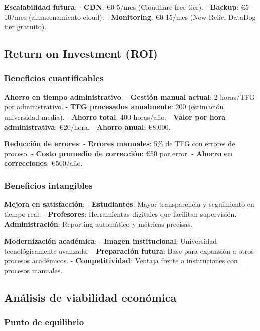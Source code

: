 \documentclass[12pt,a4paper,oneside]{report}
\begin{document}
\textbf{Escalabilidad futura}: - \textbf{CDN}: €0-5/mes (Cloudflare free
tier). - \textbf{Backup}: €5-10/mes (almacenamiento cloud). -
\textbf{Monitoring}: €0-15/mes (New Relic, DataDog tier gratuito).

\subsection{Return on Investment (ROI)}\label{return-on-investment-roi}

\subsubsection{Beneficios
cuantificables}\label{beneficios-cuantificables}

\textbf{Ahorro en tiempo administrativo}: - \textbf{Gestión manual
actual}: 2 horas/TFG por administrativo. - \textbf{TFG procesados
anualmente}: 200 (estimación universidad media). - \textbf{Ahorro
total}: 400 horas/año. - \textbf{Valor por hora administrativa}:
€20/hora. - \textbf{Ahorro anual}: €8,000.

\textbf{Reducción de errores}: - \textbf{Errores manuales}: 5\% de TFG
con errores de proceso. - \textbf{Costo promedio de corrección}: €50 por
error. - \textbf{Ahorro en correcciones}: €500/año.

\subsubsection{Beneficios intangibles}\label{beneficios-intangibles}

\textbf{Mejora en satisfacción}: - \textbf{Estudiantes}: Mayor
transparencia y seguimiento en tiempo real. - \textbf{Profesores}:
Herramientas digitales que facilitan supervisión. -
\textbf{Administración}: Reporting automático y métricas precisas.

\textbf{Modernización académica}: - \textbf{Imagen institucional}:
Universidad tecnológicamente avanzada. - \textbf{Preparación futura}:
Base para expansión a otros procesos académicos. -
\textbf{Competitividad}: Ventaja frente a instituciones con procesos
manuales.

\subsection{Análisis de viabilidad
económica}\label{anuxe1lisis-de-viabilidad-econuxf3mica}

\subsubsection{Punto de equilibrio}\label{punto-de-equilibrio}
\end{document}
